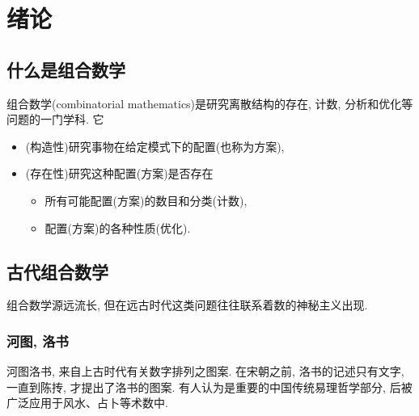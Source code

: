 \setcounter{chapter}{-1}
\chapter{绪论}

\section{什么是组合数学}

    \textsf{组合数学}(combinatorial mathematics)是研究离散结构的存在, 计数, 分析和优化等问题的一门学科. 它

    \begin{itemize}
        \item (构造性)研究事物在给定模式下的配置(也称为方案),
        \item (存在性)研究这种配置(方案)是否存在
            \begin{itemize}
                \item 所有可能配置(方案)的数目和分类(计数),
                \item 配置(方案)的各种性质(优化).
            \end{itemize}
    \end{itemize}

\section{古代组合数学}

    组合数学源远流长, 但在远古时代这类问题往往联系着数的神秘主义出现. 

    \subsection{河图, 洛书}

        河图洛书, 来自上古时代有关数字排列之图案. 在宋朝之前, 洛书的记述只有文字, 一直到陈抟, 才提出了洛书的图案. 有人认为是重要的中国传统易理哲学部分, 后被广泛应用于风水、占卜等术数中. 
       
